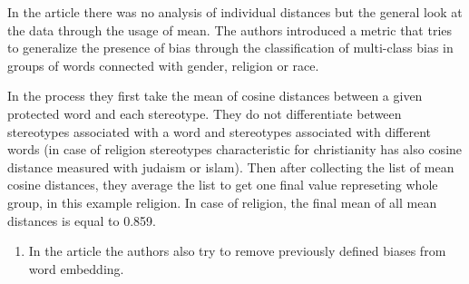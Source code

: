 \documentclass[12pt,]{book}
\providecommand{\tightlist}{%
  \setlength{\itemsep}{0pt}\setlength{\parskip}{0pt}}
\begin{document}
\begin{table}

\caption{\label{tab:religionTableHeadEarly}Head of the religion dataset.}
\centering
{}
\end{table}

\normalsize

\pagebreak 

In the article there was no analysis of individual distances but the
general look at the data through the usage of mean. The authors
introduced a metric that tries to generalize the presence of bias
through the classification of multi-class bias in groups of words
connected with gender, religion or race.

In the process they first take the mean of cosine distances between a
given protected word and each stereotype. They do not differentiate
between stereotypes associated with a word and stereotypes associated
with different words (in case of religion stereotypes characteristic for
christianity has also cosine distance measured with judaism or islam).
Then after collecting the list of mean cosine distances, they average
the list to get one final value represeting whole group, in this example
religion. In case of religion, the final mean of all mean distances is
equal to 0.859.

\begin{enumerate}
\def\labelenumi{\arabic{enumi}.}
\setcounter{enumi}{2}
\tightlist
\item
  In the article the authors also try to remove previously defined
  biases from word embedding.
\end{enumerate}
\end{document}
